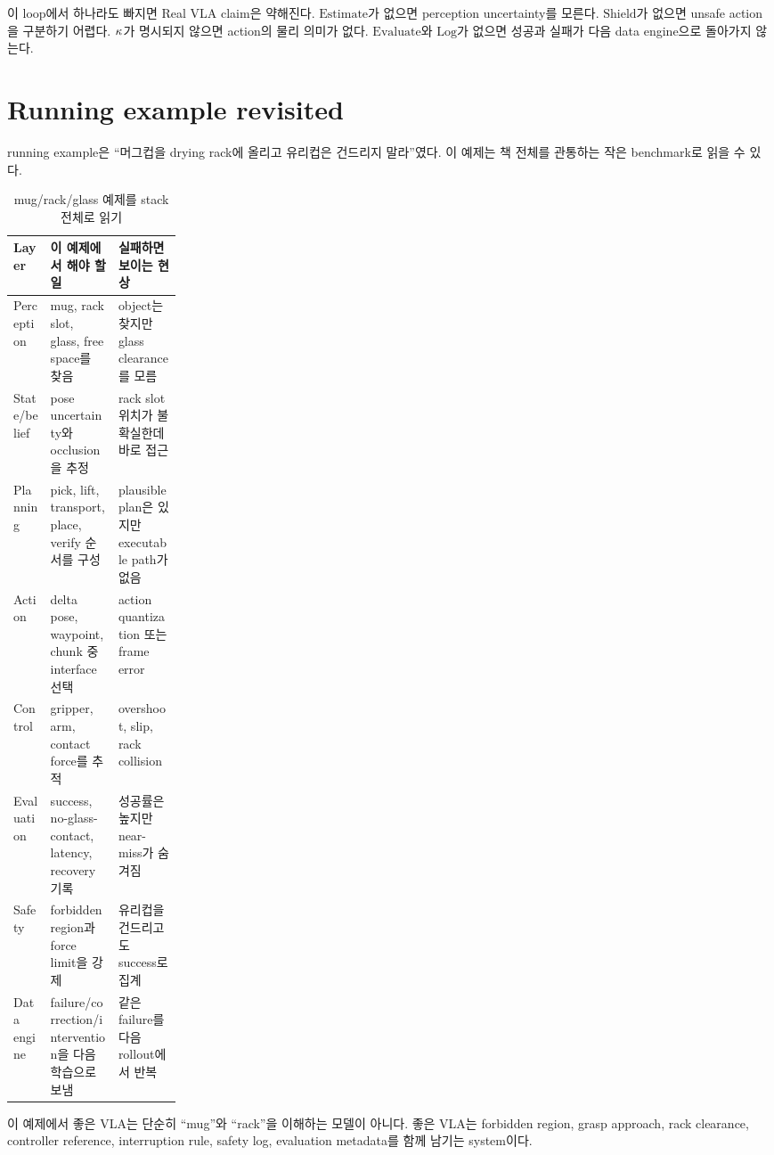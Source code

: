 이 loop에서 하나라도 빠지면 Real VLA claim은 약해진다. $\mathrm{Estimate}$가 없으면 perception uncertainty를 모른다. $\mathrm{Shield}$가 없으면 unsafe action을 구분하기 어렵다. $\kappa$가 명시되지 않으면 action의 물리 의미가 없다. $\mathrm{Evaluate}$와 $\mathrm{Log}$가 없으면 성공과 실패가 다음 data engine으로 돌아가지 않는다.

\section{Running example revisited}

running example은 ``머그컵을 drying rack에 올리고 유리컵은 건드리지 말라''였다. 이 예제는 책 전체를 관통하는 작은 benchmark로 읽을 수 있다.

\begin{table}[h]
  \centering
  \caption{mug/rack/glass 예제를 stack 전체로 읽기}
  \begin{tabularx}{\linewidth}{p{0.22\linewidth}X X}
    \toprule
    Layer & 이 예제에서 해야 할 일 & 실패하면 보이는 현상 \\
    \midrule
    Perception & mug, rack slot, glass, free space를 찾음 & object는 찾지만 glass clearance를 모름 \\
    State/belief & pose uncertainty와 occlusion을 추정 & rack slot 위치가 불확실한데 바로 접근 \\
    Planning & pick, lift, transport, place, verify 순서를 구성 & plausible plan은 있지만 executable path가 없음 \\
    Action & delta pose, waypoint, chunk 중 interface 선택 & action quantization 또는 frame error \\
    Control & gripper, arm, contact force를 추적 & overshoot, slip, rack collision \\
    Evaluation & success, no-glass-contact, latency, recovery 기록 & 성공률은 높지만 near-miss가 숨겨짐 \\
    Safety & forbidden region과 force limit을 강제 & 유리컵을 건드리고도 success로 집계 \\
    Data engine & failure/correction/intervention을 다음 학습으로 보냄 & 같은 failure를 다음 rollout에서 반복 \\
    \bottomrule
  \end{tabularx}
  \label{tab:ch21-running-example}
\end{table}

이 예제에서 좋은 VLA는 단순히 ``mug''와 ``rack''을 이해하는 모델이 아니다. 좋은 VLA는 forbidden region, grasp approach, rack clearance, controller reference, interruption rule, safety log, evaluation metadata를 함께 남기는 system이다.

